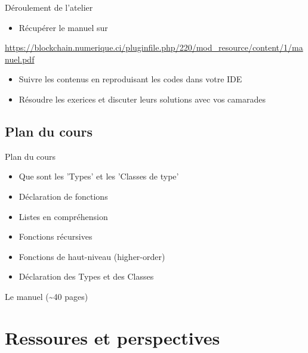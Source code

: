 \documentclass[presentation]{beamer}
\begin{document}
\begin{frame}[label={sec:orge1c99c6}]{Déroulement de l'atelier}
\begin{itemize}
\item <1>Récupérer le manuel sur
\end{itemize}
\url{https://blockchain.numerique.ci/pluginfile.php/220/mod\_resource/content/1/manuel.pdf}
\begin{itemize}
\item <2> Suivre les contenus en reproduisant les codes dans votre IDE
\item <3> Résoudre les exerices et discuter leurs solutions avec vos camarades
\end{itemize}
\end{frame}
\subsection{Plan du cours}
\label{sec:orged82b31}
\begin{frame}[label={sec:orgbc5c1db}]{}
\begin{block}{Plan du cours}
\begin{itemize}
\item Que sont les 'Types' et les 'Classes de type'
\item Déclaration de fonctions
\item Listes en compréhension
\item Fonctions récursives
\item Fonctions de haut-niveau (higher-order)
\item Déclaration des Types et des Classes
\end{itemize}
\end{block}
\begin{block}{Le manuel (\textasciitilde{}40 pages)}
\end{block}
\end{frame}

\section{Ressoures et perspectives}
\label{sec:orgd0291f8}
\end{document}
